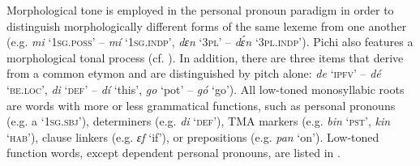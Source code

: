 
Morphological tone is employed in the personal pronoun paradigm in order to distinguish morphologically different forms of the same lexeme from one another (e.g. \textit{mi} \textsc{‘1sg.poss’} – \textit{mí} \textsc{‘1sg.indp’}, \textit{dɛn} ‘\textsc{3pl}’ – \textit{dɛ́n} ‘\textsc{3pl.indp}’). Pichi also features a morphological tonal process (cf. ). In addition, there are three items that derive from a common etymon and are distinguished by pitch alone: \textit{de} ‘\textsc{ipfv}’ – \textit{dé} ‘\textsc{be}.\textsc{loc}’, \textit{di} \textsc{‘def’} – \textit{dí} ‘this’, \textit{go} ‘pot’ – \textit{gó} ‘go’). All low-toned monosyllabic roots are words with more or less grammatical functions, such as personal pronouns (e.g. a ‘\textsc{1sg.sbj}’), determiners (e.g. \textit{di} ‘\textsc{def}’), TMA markers (e.g. \textit{bin} ‘\textsc{pst}’, \textit{kin} ‘\textsc{hab}’), clause linkers (e.g. \textit{ɛf} ‘if’), or prepositions (e.g. \textit{pan} ‘on’). Low-toned function words, except dependent personal pronouns, are listed in .

